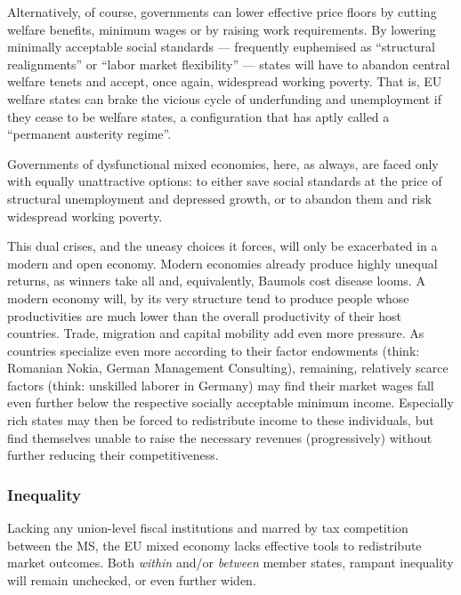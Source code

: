 \documentclass[11pt,a4paper,oneside]{article}
\begin{document}
Alternatively, of course, governments can lower effective price floors by cutting welfare benefits, minimum wages or by raising work requirements.
By lowering minimally acceptable social standards --- frequently euphemised as ``structural realignments'' or ``labor market flexibility'' --- states will have to abandon central welfare tenets and accept, once again, widespread working poverty.
That is, \gls{EU} welfare states can brake the vicious cycle of underfunding and unemployment if they cease to be welfare states, a configuration that \cite{Streeck2010b} has aptly called a ``permanent austerity regime''.

Governments of dysfunctional mixed economies, here, as always, are faced only with equally unattractive options:
to either save social standards at the price of structural unemployment and depressed growth, or to abandon them and risk widespread working poverty.

This dual crises, and the uneasy choices it forces, will only be exacerbated in a modern and open economy.
Modern economies already produce highly unequal returns, as winners take all and, equivalently, Baumols cost disease looms.
A modern economy will, by its very structure tend to produce people whose productivities are much lower than the overall productivity of their host countries.
Trade, migration and capital mobility add even more pressure.
As countries specialize even more according to their factor endowments (think: Romanian Nokia, German Management Consulting), remaining, relatively scarce factors (think: unskilled laborer in Germany) may find their market wages fall even further below the respective socially acceptable minimum income.
Especially rich states may then be forced to redistribute income to these individuals, but find themselves unable to raise the necessary revenues (progressively) without further reducing their competitiveness.


\subsubsection{Inequality}
Lacking any union-level fiscal institutions and marred by tax competition between the \gls{MS}, the \gls{EU} mixed economy lacks effective tools to redistribute market outcomes.
Both \emph{within} and/or \emph{between} member states, rampant inequality will remain unchecked, or even further widen.
\end{document}
